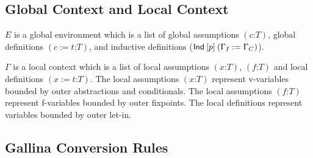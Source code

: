 \documentclass[a4paper,fleqn]{article}
\def\gallina{\textrm{Gallina}}
\newcommand{\kwmatch}{\mbox{\color{mygreen}\ttfamily match}}
\newcommand{\gassum}[2]{(#1\mathord{:}#2)}
\newcommand{\glodef}[3]{(#1:=#2\mathord{:}#3)}
\newcommand{\lassum}[2]{(#1\mathord{:}#2)}
\newcommand{\ldef}[3]{(#1:=#2\mathord{:}#3)}
\begin{document}

\subsection{Global Context and Local Context}

$E$ is a global environment which is a list of
global assumptions $\gassum{c}{T}$,
global definitions $\glodef{c}{t}{T}$, and
inductive definitions ($\text{\sf Ind}\:[p]\:(\Gamma_I := \Gamma_C)$).

$\Gamma$ is a local context which is a list of
local assumptions $\lassum{x}{T}$, $\lassum{f}{T}$ and
local definitions $\ldef{x}{t}{T}$.
The local assumptions $\lassum{x}{T}$ represent v-variables bounded by outer abstractions and conditionals.
The local assumptions $\lassum{f}{T}$ represent f-variables bounded by outer fixpoints.
The local definitions represent variables bounded by outer let-in.

\subsection{\gallina{} Conversion Rules}\label{sec:conversion-rules}
\end{document}
